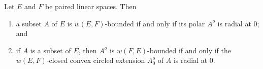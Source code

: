 Let $E$ and $F$ be paired linear spaces. Then

\begin{enumerate}
\item[(i)] a subset $A$ of $E$ is $w(E,F)$-bounded if and only if its polar $A^{o}$ is radial at $0$; and
\item[(ii)] if $A$ is a subset of $E$, then $A^{o}$ is $w(F,E)$-bounded if and only if the $w(E,F)$-closed convex circled extension $A^{o}_{0}$ of $A$ is radial at $0$.
\end{enumerate}
